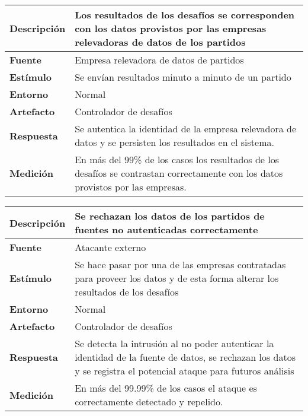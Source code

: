 \begin{center}
  \begin{tabular}{| l | p{10cm} | }
    \hline
	\textbf{Descripción} & Los resultados de los desafíos se corresponden con los datos provistos por las empresas relevadoras de datos de los partidos\\  \hline
	\textbf{Fuente} & Empresa relevadora de datos de partidos\\  \hline
	\textbf{Estímulo} & Se envían resultados minuto a minuto de un partido\\  \hline
	\textbf{Entorno} & Normal\\  \hline
	\textbf{Artefacto} & Controlador de desafíos\\  \hline
	\textbf{Respuesta} & Se autentica la identidad de la empresa relevadora de datos y se persisten los resultados en el sistema.\\  \hline
	\textbf{Medición} & En más del 99\% de los casos los resultados de los desafíos se contrastan correctamente con los datos provistos por las empresas.\\  \hline
  \end{tabular}
\end{center}

\begin{center}
  \begin{tabular}{| l | p{10cm} | }
    \hline
	\textbf{Descripción} & Se rechazan los datos de los partidos de fuentes no autenticadas correctamente\\  \hline
	\textbf{Fuente} & Atacante externo\\  \hline
	\textbf{Estímulo} & Se hace pasar por una de las empresas contratadas para proveer los datos y de esta forma alterar los resultados de los desafíos\\  \hline
	\textbf{Entorno} & Normal\\  \hline
	\textbf{Artefacto} & Controlador de desafíos\\  \hline
	\textbf{Respuesta} & Se detecta la intrusión al no poder autenticar la identidad de la fuente de datos, se rechazan los datos y se registra el potencial ataque para futuros análisis\\  \hline
	\textbf{Medición} & En más del 99.99\% de los casos el ataque es correctamente detectado y repelido.\\  \hline
  \end{tabular}
\end{center}    


